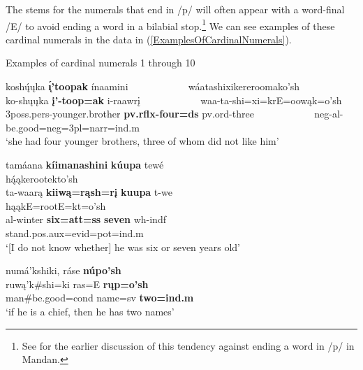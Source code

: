 The stems for the numerals that end in /p/ will often appear with a word-final /E/ to avoid ending a word in a bilabial stop.\footnote{See  for the earlier discussion of this tendency against ending a word in /p/ in Mandan.} We can see examples of these cardinal numerals in the data in (\ref{ExamplesOfCardinalNumerals}).

\newpage
\begin{exe}

\item\label{ExamplesOfCardinalNumerals} Examples of cardinal numerals 1 through 10

\begin{xlist}
\item\label{ExamplesOfCardinalNumerals1} \glll koshų́ųka \textbf{\'{ı̨}'toopak} ínaamini ~ ~ ~ ~ ~ ~ ~   wáatashixikereroomako'sh\\
    ko-shųųka \textbf{į'-toop=ak} i-raawrį ~ ~ ~ ~ ~ ~ ~  waa-ta-shi=xi=krE=oowąk=o'sh\\
    3poss.pers-\textnormal{younger.brother} \textbf{pv.rflx-\textnormal{\bfseries four}=ds} pv.ord-\textnormal{three} ~ ~ ~ ~ ~ ~ ~  neg-al-\textnormal{be.good}=neg=3pl=narr=ind.m\\
    \glt `she had four younger brothers, three of whom did not like him' \citep[129]{hollow1973a}
    
\item\label{ExamplesOfCardinalNumerals2} \glll tamáana \textbf{kíimanashini} \textbf{kúupa} tewé ~ ~ ~ ~ ~ ~ ~ ~ ~ ~ ~ ~ ~ ~ ~ ~ ~ ~ ~ ~  hą́ąkerootekto'sh\\
    ta-waarą \textbf{kiiwą=rąsh=rį} \textbf{kuupa} t-we ~ ~ ~ ~ ~ ~ ~ ~ ~ ~ ~ ~ ~ ~ ~ ~ ~ ~ ~ ~   hąąkE=rootE=kt=o'sh\\
    al-\textnormal{winter} \textbf{\textnormal{\bfseries six}=att=ss} \textbf{\textnormal{\bfseries seven}} wh-indf ~ ~ ~ ~ ~ ~ ~ ~ ~ ~ ~ ~ ~ ~ ~ ~ ~ ~ ~ ~  \textnormal{stand}.pos.aux=evid=pot=ind.m\\
    \glt `[I do not know whether] he was six or seven years old' \citep[195]{hollow1973a}

\item\label{ExamplesOfCardinalNumerals3} \glll numá'kshiki, ráse \textbf{núpo'sh}\\
    ruwą'k\#shi=ki ras=E \textbf{rųp=o'sh}\\
    \textnormal{man}\#\textnormal{be.good}=cond \textnormal{name}=sv \textbf{\textnormal{\bfseries two}=ind.m}\\
    \glt `if he is a chief, then he has two names' \citep[14]{hollow1973a}
    
\end{xlist}

\end{exe}

